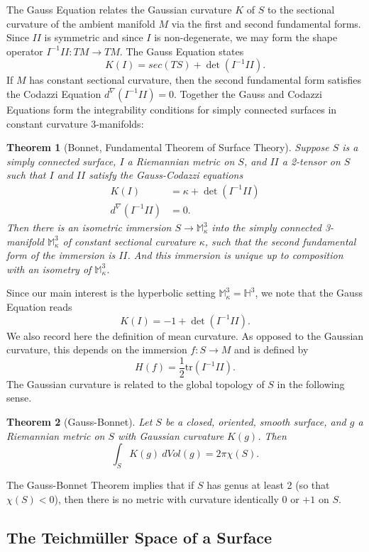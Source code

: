 \documentclass{amsart}
\renewcommand{\H}{\mathbb{H}}
\newtheorem{thm}{Theorem}[section]
\newcommand{\two}{I\!\!I}
\begin{document}
 
The Gauss Equation relates the Gaussian curvature $K$ of $S$ to the sectional curvature of the ambient manifold $M$ via the first and second fundamental forms.
Since $\two$ is symmetric and since $I$ is non-degenerate, we may form the shape operator $I^{-1}\two: TM \to TM$.
The Gauss Equation states
\[
K(I) = sec(TS) + \det(I^{-1}\two).
\]
If $M$ has constant sectional curvature, then the second fundamental form satisfies the Codazzi Equation $d^\nabla (I^{-1} \two) = 0$. 
Together the Gauss and Codazzi Equations form the integrability conditions for simply connected surfaces in constant curvature 3-manifolds:


\begin{thm}[Bonnet, Fundamental Theorem of Surface Theory]
Suppose $S$ is a simply connected surface, $I$ a Riemannian metric on $S$, and $\two$ a 2-tensor on $S$ such that $I$ and $\two$ satisfy the Gauss-Codazzi equations
\begin{align*}
K(I) &= \kappa + \det(I^{-1}\two) \\
d^\nabla (I^{-1}\two) &= 0.
\end{align*}
Then there is an isometric immersion $S \to \mathbb{M}_\kappa^3$ into the simply connected 3-manifold $\mathbb{M}^3_{\kappa}$ of constant sectional curvature $\kappa$, such that the second fundamental form of the immersion is $\two$. And this immersion is unique up to composition with an isometry of $\mathbb{M}_\kappa^3$.
\end{thm}

Since our main interest is the hyperbolic setting $\mathbb{M}_\kappa^3 = \H^3$, we note that the Gauss Equation reads
\[
K(I) = -1 + \det(I^{-1}\two).
\]
We also record here the definition of mean curvature. 
As opposed to the Gaussian curvature, this depends on the immersion $f: S \to M$ and is defined by 
\[
H(f) = \frac{1}{2} \mathrm{tr}(I^{-1}\two).
\]
The Gaussian curvature is related to the global topology of $S$ in the following sense. 
\begin{thm}[Gauss-Bonnet]
Let $S$ be a closed, oriented, smooth surface, and $g$ a Riemannian metric on $S$ with Gaussian curvature $K(g)$. 
Then 
\[
\int_S K(g) \ dVol(g) = 2 \pi \chi(S).
\]
\end{thm}
The Gauss-Bonnet Theorem implies that if $S$ has genus at least 2 (so that $\chi(S) < 0$), then there is no metric with curvature identically 0 or $+1$ on $S$.



\subsection{The Teichm\"uller Space of a Surface}
\end{document}
